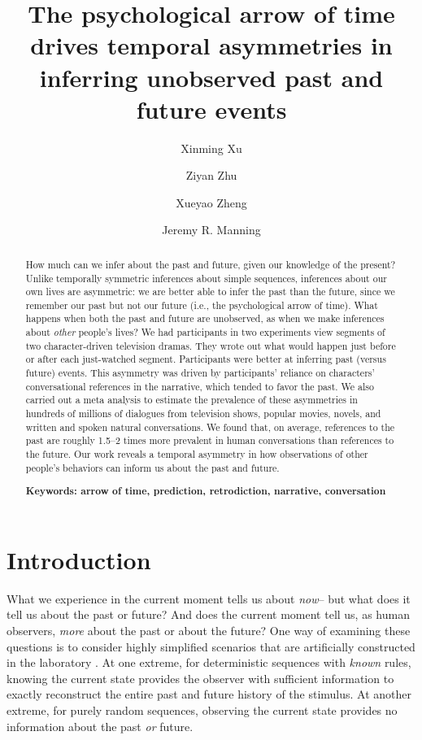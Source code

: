 \documentclass[10pt]{article}
\title{\Large The psychological arrow of time drives temporal asymmetries in inferring unobserved past and future events}
\author[1]{Xinming Xu}
\author[2]{Ziyan Zhu}
\author[3]{Xueyao Zheng}
\author[1, $\star$]{Jeremy R. Manning}
\affil[1]{Dartmouth College, Hanover, NH, USA}
\affil[2]{Peking University, Beijing, China}
\affil[3]{Beijing Normal University, Beijing, China}
\affil[$\star$]{Address correspondence to jeremy.r.manning@dartmouth.edu}
\begin{document}
\maketitle

\begin{abstract} {\footnotesize{ How much can we infer about the past and future, given our knowledge of the present? Unlike temporally symmetric inferences about simple sequences, inferences about our own lives are asymmetric: we are better able to infer the past than the future, since we remember our past but not our future (i.e., the psychological arrow of time). What happens when both the past and future are unobserved, as when we make inferences about \textit{other} people's lives? We had participants in two experiments view segments of two character-driven television dramas. They wrote out what would happen just before or after each just-watched segment. Participants were better at inferring past (versus future) events. This asymmetry was driven by participants’ reliance on characters’ conversational references in the narrative, which tended to favor the past. We also carried out a meta analysis to estimate the prevalence of these asymmetries in hundreds of millions of dialogues from television shows, popular movies, novels, and written and spoken natural conversations. We found that, on average, references to the past are roughly 1.5--2 times more prevalent in human conversations than references to the future. Our work reveals a temporal asymmetry in how observations of other people’s behaviors can inform us about the past and future.

\textbf{Keywords: arrow of time, prediction, retrodiction, narrative, conversation}}}

\end{abstract}

\section*{Introduction} 

What we experience in the current moment tells us about \textit{now}-- but what does it tell us about the past or future? And does the current moment tell us, as human observers, \textit{more} about the past or about the future? One way of examining these questions is to consider highly simplified scenarios that are artificially constructed in the laboratory \citep[e.g., ][]{MaheEtal22}. At one extreme, for deterministic sequences with \textit{known} rules, knowing the current state provides the observer with sufficient information to exactly reconstruct the entire past and future history of the stimulus. At another extreme, for purely random sequences, observing the current state provides no information about the past \textit{or} future.
\end{document}
